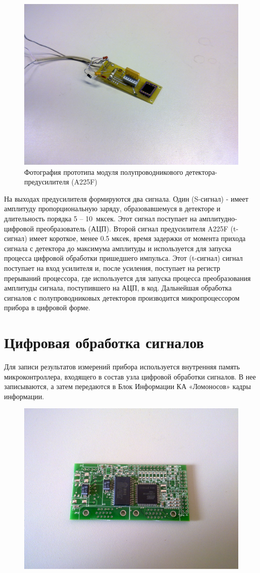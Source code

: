 \begin{figure}
\centering
\includegraphics[width=0.7\linewidth]{images/04062010073}
\caption{Фотография прототипа модуля полупроводникового детектора-предусилителя (A225F)}
\label{fig:a225}
\end{figure}

На выходах предусилителя формируются два сигнала. Один (S-сигнал) - имеет амплитуду пропорциональную заряду, образовавшемуся в детекторе и длительность порядка 5 -- 10~мксек. Этот сигнал поступает на амплитудно-цифровой преобразователь (АЦП). Второй сигнал предусилителя A225F (t-сигнал) имеет короткое, менее 0.5 мксек, время задержки от момента прихода сигнала с детектора до максимума амплитуды и используется для запуска процесса цифровой обработки пришедшего импульса. Этот (t-сигнал) сигнал поступает на вход усилителя и, после усиления, поступает на регистр прерываний процессора, где используется для запуска процесса преобразования амплитуды сигнала, поступившего на АЦП, в код. Дальнейшая обработка сигналов с полупроводниковых детекторов производится микропроцессором прибора в цифровой форме.

\section{Цифровая обработка сигналов}

Для записи результатов измерений прибора используется внутренняя память микроконтроллера, входящего в состав узла цифровой обработки сигналов. В нее записываются, а затем передаются в Блок Информации КА «Ломоносов» кадры информации.
\begin{figure}
\centering
\includegraphics[width=0.7\linewidth]{images/04062010070.jpg}
\caption{}
\label{fig:04062010070}
\end{figure}

